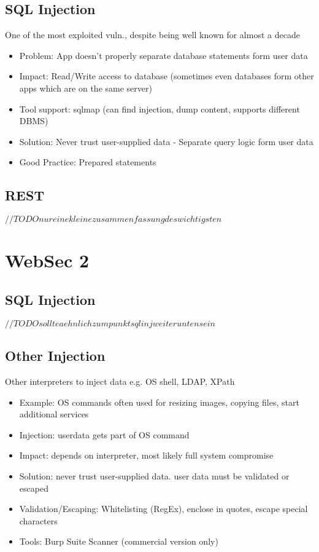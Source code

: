 \documentclass[a4paper, 12pt]{article}
\begin{document}
\subsection{SQL Injection}
One of the most exploited vuln., despite being well known for almost a decade
\begin{itemize}
\item Problem: App doesn't properly separate database statements form user data
\item Impact: Read/Write access to database (sometimes even databases form other apps which are on the same server)
\item Tool support: sqlmap (can find injection, dump content, supports different DBMS)
\item Solution: Never trust user-supplied data - Separate query logic form user data
\item Good Practice: Prepared statements
\end{itemize}
\subsection{REST}
$ //TODO nur eine kleine zusammenfassung des wichtigsten$

\section{WebSec 2}
\subsection{SQL Injection}
$ //TODO sollte aehnlich zum punkt sql inj weiter unten sein $
\subsection{Other Injection}
Other interpreters to inject data e.g. OS shell, LDAP, XPath \\
\begin{itemize}
\item Example: OS commands often used for resizing images, copying files, start additional services
\item Injection: userdata gets part of OS command
\item Impact: depends on interpreter, most likely full system compromise
\item Solution: never trust user-supplied data. user data must be validated or escaped
\item Validation/Escaping: Whitelisting (RegEx), enclose in quotes, escape special characters
\item Tools: Burp Suite Scanner (commercial version only)
\end{itemize}
\end{document}
